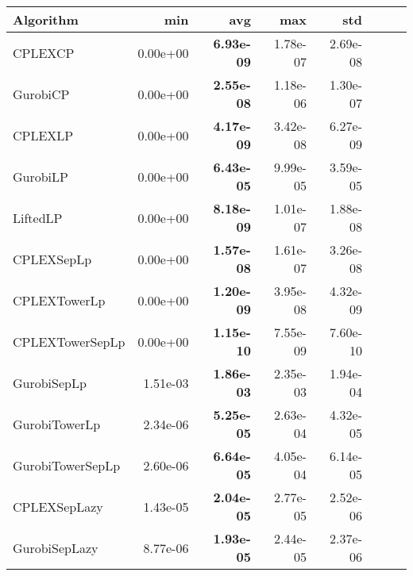 \begin{tabular}{lrrrrrrr}
Algorithm & min & avg & max & std
\\
\hline
CPLEXCP&0.00e+00& \bf6.93e-09& 1.78e-07& 2.69e-08\\
GurobiCP&0.00e+00& \bf2.55e-08& 1.18e-06& 1.30e-07\\
CPLEXLP&0.00e+00& \bf4.17e-09& 3.42e-08& 6.27e-09\\
GurobiLP&0.00e+00& \bf6.43e-05& 9.99e-05& 3.59e-05\\
LiftedLP&0.00e+00& \bf8.18e-09& 1.01e-07& 1.88e-08\\
CPLEXSepLp&0.00e+00& \bf1.57e-08& 1.61e-07& 3.26e-08\\
CPLEXTowerLp&0.00e+00& \bf1.20e-09& 3.95e-08& 4.32e-09\\
CPLEXTowerSepLp&0.00e+00& \bf1.15e-10& 7.55e-09& 7.60e-10\\
GurobiSepLp&1.51e-03& \bf1.86e-03& 2.35e-03& 1.94e-04\\
GurobiTowerLp&2.34e-06& \bf5.25e-05& 2.63e-04& 4.32e-05\\
GurobiTowerSepLp&2.60e-06& \bf6.64e-05& 4.05e-04& 6.14e-05\\
CPLEXSepLazy&1.43e-05& \bf2.04e-05& 2.77e-05& 2.52e-06\\
GurobiSepLazy&8.77e-06& \bf1.93e-05& 2.44e-05& 2.37e-06
\end{tabular}
